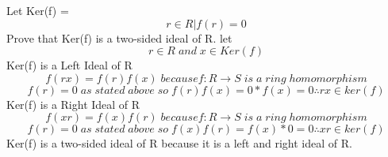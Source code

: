 \documentclass[12pt]{article}
\begin{document}
\begin{enumerate}
\begin{itemize}
          Let Ker(f) = \[ r \in R | f(r) = 0 \] Prove that Ker(f) is a two-sided ideal of R. 
          let \[ r \in R \; and \; x \in Ker(f) \]
          Ker(f) is a Left Ideal of R
            \[ f(rx) = f(r)f(x) \; because f:R \rightarrow S \;is \;a \;ring \;homomorphism \]
            \[ f(r) = 0 \;as \;stated \;above \;so \;f(r)f(x) = 0*f(x) = 0 \therefore rx \in ker(f)\]
          Ker(f) is a Right Ideal of R
            \[ f(xr) = f(x)f(r) \; because f:R \rightarrow S \;is \;a \;ring\;homomorphism \]
            \[ f(r) = 0 \;as\;stated\;above\;so\; f(x)f(r) = f(x)*0 = 0 \therefore xr \in ker(f)\]
          Ker(f) is a two-sided ideal of R because it is a left and right ideal of R.
     
      \end{itemize}

\end{enumerate}
\end{document}
